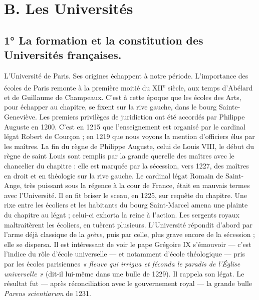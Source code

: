 \documentclass[french,twoside]{book} %
\begin{document}
\section[B. Les Universités]{B. Les Universités}
\label{c11b}
\subsection[1° La formation et la constitution des Universités françaises.]{1° La formation et la constitution des Universités françaises.}
\noindent L’Université de Paris. Ses origines échappent à notre période. L’importance des écoles de Paris remonte à la première moitié du XII\textsuperscript{e} siècle, aux temps d’Abélard et de Guillaume de Champeaux. C’est à cette époque que les écoles des Arts, pour échapper au chapitre, se fixent sur la rive gauche, dans le bourg Sainte-Geneviève. Les premiers privilèges de juridiction ont été accordés par Philippe Auguste en 1200. C’est en 1215 que l’enseignement est organisé par le cardinal légat Robert de Courçon ; en 1219 que nous voyons la mention d’officiers élus par les maîtres. La fin du règne de Philippe Auguste, celui de Louis VIII, le début du règne de saint Louis sont remplis par la grande querelle des maîtres avec le chancelier du chapitre : elle est marquée par la sécession, vers 1227, des maîtres en droit et en théologie sur la rive gauche. Le cardinal légat Romain de Saint-Ange, très puissant sous la régence à la cour de France, était en mauvais termes avec l’Université. Il en fit briser le sceau, en 1225, sur requête du chapitre. Une rixe entre les écoliers et les habitants du bourg Saint-Marcel amena une plainte du chapitre au légat ; celui-ci exhorta la reine à l’action. Les sergents royaux maltraitèrent les écoliers, en tuèrent plusieurs. L’Université répondit d’abord par l’arme déjà classique de la \emph{grève}, puis par celle, plus grave encore de la sécession ; elle se dispersa. Il est intéressant de voir le pape Grégoire IX s’émouvoir — c’est l’indice du rôle d’école universelle — et notamment d’école théologique — pris par les écoles parisiennes \emph{« fleuve qui irrigua et féconda le paradis de l’Église universelle »} (dit-il lui-même dans une bulle de 1229). Il rappela son légat. Le résultat fut — après réconciliation avec le gouvernement royal — la grande bulle {\itshape Parens scientiarum} de 1231.\par
\end{document}
